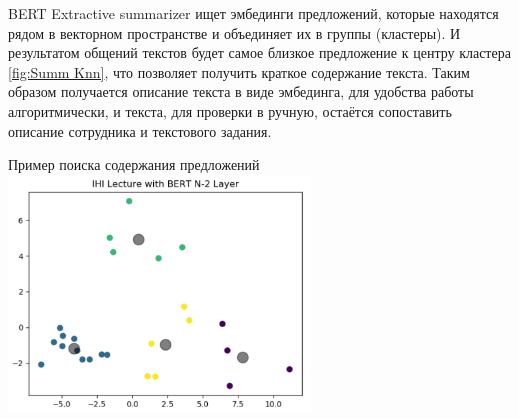 \documentclass[PI,KR]{HSEUniversity}
\begin{document}
BERT Extractive summarizer ищет эмбединги предложений, которые находятся рядом в векторном пространстве и объединяет их в группы (кластеры). И результатом общений текстов будет самое близкое предложение к центру кластера \ref{fig:Summ Knn}, что позволяет получить краткое содержание текста. Таким образом получается описание текста в виде эмбединга, для удобства работы алгоритмически, и текста, для проверки в ручную, остаётся сопоставить описание сотрудника и текстового задания.

\begin{FIGURE}[h]{Пример поиска содержания предложений \label{fig:Summ Knn}}
	\includegraphics[width=0.6\textwidth]{img/Summ Knn}
\end{FIGURE}
\end{document}
